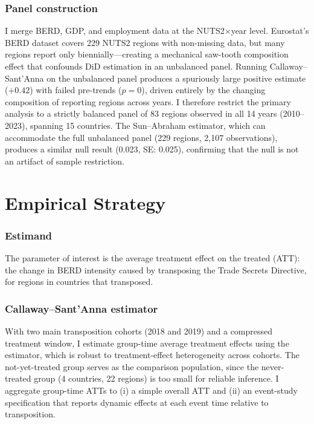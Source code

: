 \documentclass[12pt]{article}
\begin{document}
\subsubsection*{Panel construction} I merge BERD, GDP, and employment data at the NUTS2$\times$year level. Eurostat's BERD dataset covers 229 NUTS2 regions with non-missing data, but many regions report only biennially---creating a mechanical saw-tooth composition effect that confounds DiD estimation in an unbalanced panel. Running Callaway--Sant'Anna on the unbalanced panel produces a spuriously large positive estimate ($+0.42$) with failed pre-trends ($p = 0$), driven entirely by the changing composition of reporting regions across years. I therefore restrict the primary analysis to a strictly balanced panel of 83 regions observed in all 14 years (2010--2023), spanning 15 countries. The Sun--Abraham estimator, which can accommodate the full unbalanced panel (229 regions, 2,107 observations), produces a similar null result (0.023, SE: 0.025), confirming that the null is not an artifact of sample restriction.






\section{Empirical Strategy}
\label{sec:strategy}

\subsubsection*{Estimand} The parameter of interest is the average treatment effect on the treated (ATT): the change in BERD intensity caused by transposing the Trade Secrets Directive, for regions in countries that transposed.

\subsubsection*{Callaway--Sant'Anna estimator} With two main transposition cohorts (2018 and 2019) and a compressed treatment window, I estimate group-time average treatment effects using the \citet{CallawayS2021} estimator, which is robust to treatment-effect heterogeneity across cohorts. The not-yet-treated group serves as the comparison population, since the never-treated group (4 countries, 22 regions) is too small for reliable inference. I aggregate group-time ATTs to (i) a simple overall ATT and (ii) an event-study specification that reports dynamic effects at each event time relative to transposition.
\end{document}
